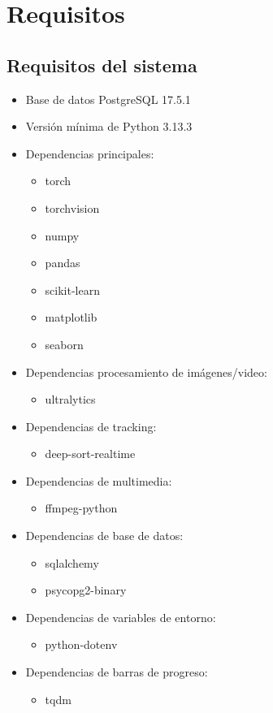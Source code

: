 	\section{Requisitos}
	\subsection{Requisitos del sistema}
	\begin{itemize}
		\item Base de datos PostgreSQL 17.5.1
		\item Versión mínima de Python 3.13.3
		\item Dependencias principales:
		\begin{itemize}
			\item torch
			\item torchvision
			\item numpy
			\item pandas
			\item scikit-learn
			\item matplotlib
			\item seaborn
		\end{itemize}
		\item Dependencias procesamiento de imágenes/video:
		\begin{itemize}
			\item ultralytics
		\end{itemize}
		\item Dependencias de tracking:
		\begin{itemize}
			\item deep-sort-realtime
		\end{itemize}
		\item Dependencias de multimedia:
		\begin{itemize}
			\item ffmpeg-python
		\end{itemize}
		\item Dependencias de base de datos:
		\begin{itemize}
			\item sqlalchemy
			\item psycopg2-binary
		\end{itemize}
		\item Dependencias de variables de entorno:
		\begin{itemize}
			\item python-dotenv
		\end{itemize}
		\item Dependencias de barras de progreso:
		\begin{itemize}
			\item tqdm
		\end{itemize}
	
	\end{itemize}


